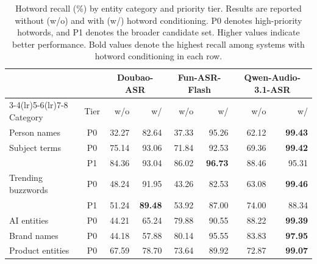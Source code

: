 \documentclass{article}
\begin{document}
\begin{table}[t]
\centering
\caption{Hotword recall (\%) by entity category and priority tier.
Results are reported without (w/o) and with (w/) hotword conditioning.
P0 denotes high-priority hotwords, and P1 denotes the broader candidate set.
Higher values indicate better performance. Bold values denote the highest
recall among systems with hotword conditioning in each row.}
\label{tab:hotword-recall}
\begingroup
\small
\setlength{\tabcolsep}{4pt}
\renewcommand{\arraystretch}{1.15}
\begin{tabular*}{\textwidth}{@{\extracolsep{\fill}}lc*{6}{r}@{}}
\toprule
\multicolumn{2}{c}{}
& \multicolumn{2}{c}{Doubao-ASR}
& \multicolumn{2}{c}{Fun-ASR-Flash}
& \multicolumn{2}{c}{Qwen-Audio-3.1-ASR} \\
\cmidrule(lr){3-4}\cmidrule(lr){5-6}\cmidrule(lr){7-8}
Category & Tier & w/o & w/ & w/o & w/ & w/o & w/ \\
\midrule
Person names       & P0 & 32.27 & 82.64 & 37.33 & 95.26 & 62.12 & \textbf{99.43} \\
\addlinespace[3pt]
Subject terms      & P0 & 75.14 & 93.06 & 71.84 & 92.53 & 69.36 & \textbf{99.42} \\
                   & P1 & 84.36 & 93.04 & 86.02 & \textbf{96.73} & 88.46 & 95.31 \\
\addlinespace[3pt]
Trending buzzwords & P0 & 48.24 & 91.95 & 43.26 & 82.53 & 63.08 & \textbf{99.46} \\
                   & P1 & 51.24 & \textbf{89.48} & 53.92 & 87.00 & 74.00 & 88.34 \\
\addlinespace[3pt]
AI entities        & P0 & 44.21 & 65.24 & 79.88 & 90.55 & 88.22 & \textbf{99.39} \\
Brand names        & P0 & 44.18 & 57.88 & 80.14 & 95.55 & 83.83 & \textbf{97.95} \\
Product entities   & P0 & 67.59 & 78.70 & 73.64 & 89.92 & 72.87 & \textbf{99.07} \\
\bottomrule
\end{tabular*}
\endgroup
\end{table}

%
%
%
%
%
%

%



%
%
%

%

%

%
%
%
%
%
%
%
%
%
%
%
%
%
%
%
%

%

%
%
%
%
%
%
\end{document}
